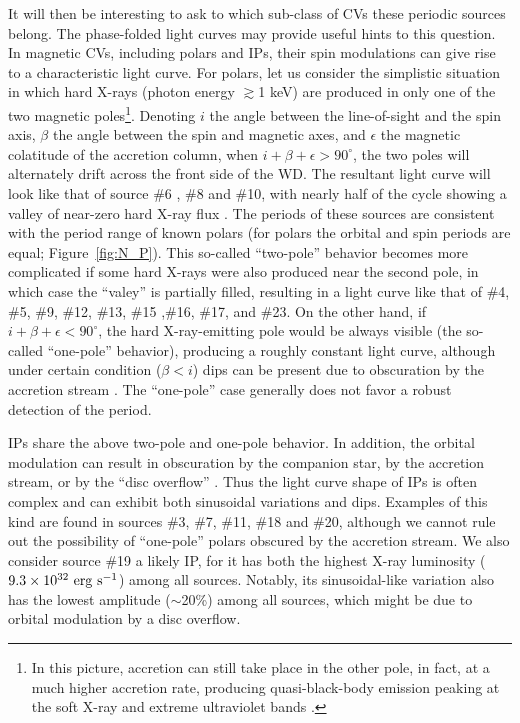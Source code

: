 \documentclass[fleqn,usenatbib]{mnras}
\begin{document}
It will then be interesting to ask to which sub-class of CVs these periodic sources belong. The phase-folded light curves may provide useful hints to this question. 
In magnetic CVs, including polars and IPs, their spin modulations can give rise to a characteristic light curve. For polars, let us consider the simplistic situation in which hard X-rays (photon energy $\gtrsim$1 keV) are produced in only one of the two magnetic poles\footnote{In this picture, accretion can still take place in the other pole, in fact, at a much higher accretion rate, producing quasi-black-body emission peaking at the soft X-ray and extreme ultraviolet bands \citep{2001cvs..book.....H}.}.
Denoting $i$ the angle between the line-of-sight and the spin axis, $\beta$ the angle between the spin and magnetic axes, and $\epsilon$ the magnetic colatitude of the accretion column, when $i+\beta+\epsilon > 90^{\circ}$, the two poles will alternately drift across the front side of the WD. 
The resultant light curve will look like that of source \#6 , \#8 and \#10, with nearly half of the cycle showing a valley of near-zero hard X-ray flux \citep{1985A&A...148L..14H}. 
The periods of these sources are consistent with the period range of known polars (for polars the orbital and spin periods are equal; Figure~\ref{fig:N_P}).
This so-called ``two-pole'' behavior becomes more complicated if some hard X-rays were also produced near the second pole, in which case the ``valey'' is partially filled, resulting in a light curve like that of \#4, \#5, \#9, \#12, \#13, \#15 ,\#16, \#17, and \#23. 
On the other hand, if $i+\beta+\epsilon < 90^{\circ}$, the hard X-ray-emitting pole would be always visible (the so-called ``one-pole'' behavior), producing a roughly constant light curve, although under certain condition ($\beta < i$) dips can be present due to obscuration by the accretion stream \citep{2001cvs..book.....H}. The ``one-pole'' case generally does not favor a robust detection of the period. 

IPs share the above two-pole and one-pole behavior. 
In addition, the orbital modulation can result in obscuration by the companion star,
by the accretion stream, or by the ``disc overflow'' \citep{1996MNRAS.280..937N}. 
Thus the light curve shape of IPs is often complex and can exhibit both sinusoidal variations and dips. Examples of this kind are found in sources \#3, \#7, \#11, \#18 and \#20, although we cannot rule out the possibility of ``one-pole'' polars obscured by the accretion stream.
We also consider source \#19 a likely IP, for it has both the highest X-ray luminosity ($9.3\times10^{32}{\rm~erg~s^{-1}}$) among all sources. Notably, its sinusoidal-like variation also has the lowest amplitude ($\sim$20\%) among all sources, which might be due to orbital modulation by a disc overflow. 
\end{document}

